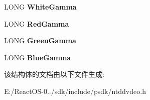 \begin{DoxyCompactItemize}
L\+O\+NG {\bfseries White\+Gamma}
\item 
\mbox{\label{struct___v_i_d_e_o___c_o_l_o_r___c_a_p_a_b_i_l_i_t_i_e_s_a6f52b0632598cf15a82b7842fcfdbc34}} 
L\+O\+NG {\bfseries Red\+Gamma}
\item 
\mbox{\label{struct___v_i_d_e_o___c_o_l_o_r___c_a_p_a_b_i_l_i_t_i_e_s_ad8069450ba3216c7d72751afc27f98f6}} 
L\+O\+NG {\bfseries Green\+Gamma}
\item 
\mbox{\label{struct___v_i_d_e_o___c_o_l_o_r___c_a_p_a_b_i_l_i_t_i_e_s_ab67b857f7b0906f4a3798db5eca28c33}} 
L\+O\+NG {\bfseries Blue\+Gamma}
\end{DoxyCompactItemize}


该结构体的文档由以下文件生成\+:\begin{DoxyCompactItemize}
\item 
E\+:/\+React\+O\+S-\/0../sdk/include/psdk/ntddvdeo.\+h\end{DoxyCompactItemize}
